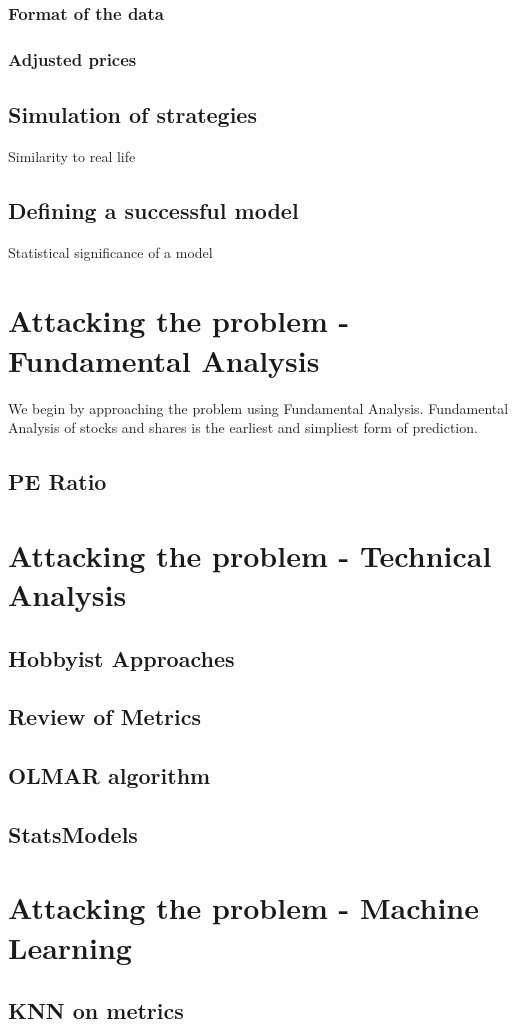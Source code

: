 \documentclass[a4paper,11pt]{article}
\begin{document}
\subsubsection{Format of the data}
\subsubsection{Adjusted prices}

\subsection{Simulation of strategies}
Similarity to real life

\subsection{Defining a successful model}
Statistical significance of a model

\section{Attacking the problem - Fundamental Analysis}

We begin by approaching the problem using Fundamental Analysis. Fundamental Analysis of stocks and shares is the earliest and simpliest form of prediction.

\subsection{PE Ratio}

\section{Attacking the problem - Technical Analysis}
\subsection{Hobbyist Approaches}
\subsection{Review of Metrics}
\subsection{OLMAR algorithm}
\subsection{StatsModels}

\section{Attacking the problem - Machine Learning}
\subsection{KNN on metrics}

\cite {website:pybrain-tutorial}



\end{document}
